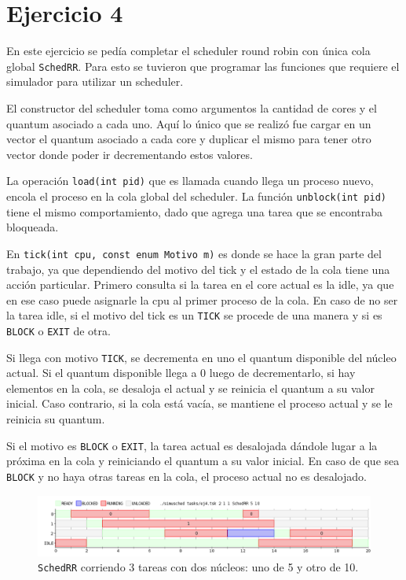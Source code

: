 \section{Ejercicio 4}

En este ejercicio se pedía completar el scheduler round robin con única cola
global \texttt{SchedRR}. Para esto se tuvieron que programar las funciones que
requiere el simulador para utilizar un scheduler.

El constructor del scheduler toma como argumentos la cantidad de cores y el
quantum asociado a cada uno. Aquí lo único que se realizó fue cargar en un
vector el quantum asociado a cada core y duplicar el mismo para tener otro
vector donde poder ir decrementando estos valores.

La operación \texttt{load(int pid)} que es llamada cuando llega un proceso
nuevo, encola el proceso en la cola global del scheduler. La función
\texttt{unblock(int pid)} tiene el mismo comportamiento, dado que agrega una
tarea que se encontraba bloqueada.

En \texttt{tick(int cpu, const enum Motivo m)} es donde se hace la gran parte
del trabajo, ya que dependiendo del motivo del tick y el estado de la cola tiene una acción
particular. Primero consulta si la tarea en el core actual es la idle, ya que
en ese caso puede asignarle la cpu al primer proceso de la cola. En caso de no
ser la tarea idle, si el motivo del tick es un \texttt{TICK} se procede de una
manera y si es \texttt{BLOCK} o \texttt{EXIT} de otra.

Si llega con motivo \texttt{TICK}, se decrementa en uno el quantum disponible
del núcleo actual. Si el quantum disponible llega a 0 luego de decrementarlo, si
hay elementos en la cola, se desaloja el actual y se reinicia el quantum a su
valor inicial. Caso contrario, si la cola está vacía, se mantiene el proceso
actual y se le reinicia su quantum.

Si el motivo es \texttt{BLOCK} o \texttt{EXIT}, la tarea actual es desalojada
dándole lugar a la próxima en la cola y reiniciando el quantum a su valor
inicial. En caso de que sea \texttt{BLOCK} y no haya otras tareas en la cola, el
proceso actual no es desalojado.

\begin{figure}[ht]
	\begin{center}
		\includegraphics[width=1\columnwidth]{imagenes/ej4.png}
		\caption{\texttt{SchedRR} corriendo 3 tareas con dos núcleos: uno de 5 y
		otro de 10.}
	\end{center}
\end{figure}
